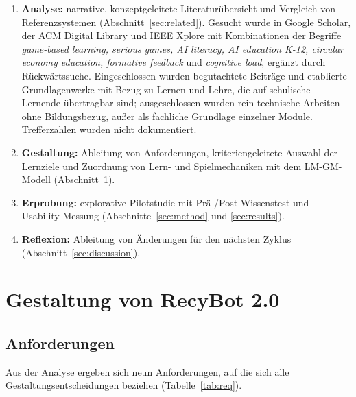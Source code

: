 \documentclass[sigconf,nonacm]{acmart}
\begin{document}
\begin{enumerate}
\item \textbf{Analyse:} narrative, konzeptgeleitete Literaturübersicht und Vergleich von Referenzsystemen (Abschnitt~\ref{sec:related}). Gesucht wurde in Google Scholar, der ACM Digital Library und IEEE Xplore mit Kombinationen der Begriffe \textit{game-based learning, serious games, AI literacy, AI education K-12, circular economy education, formative feedback} und \textit{cognitive load}, ergänzt durch Rückwärtssuche. Eingeschlossen wurden begutachtete Beiträge und etablierte Grundlagenwerke mit Bezug zu Lernen und Lehre, die auf schulische Lernende übertragbar sind; ausgeschlossen wurden rein technische Arbeiten ohne Bildungsbezug, außer als fachliche Grundlage einzelner Module. Trefferzahlen wurden nicht dokumentiert.
\item \textbf{Gestaltung:} Ableitung von Anforderungen, kriteriengeleitete Auswahl der Lernziele und Zuordnung von Lern- und Spielmechaniken mit dem LM-GM-Modell \cite{arnab2015} (Abschnitt~\ref{sec:design}).
\item \textbf{Erprobung:} explorative Pilotstudie mit Prä-/Post-Wissenstest und Usability-Messung (Abschnitte~\ref{sec:method} und \ref{sec:results}).
\item \textbf{Reflexion:} Ableitung von Änderungen für den nächsten Zyklus (Abschnitt~\ref{sec:discussion}).
\end{enumerate}

\section{Gestaltung von RecyBot 2.0}
\label{sec:design}
\subsection{Anforderungen}
Aus der Analyse ergeben sich neun Anforderungen, auf die sich alle Gestaltungsentscheidungen beziehen (Tabelle~\ref{tab:req}).
\end{document}
